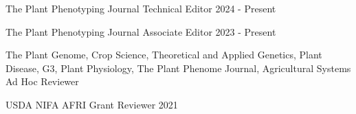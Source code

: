 
\begin{cventries}

  \cventry
    {The Plant Phenotyping Journal} %
    {Technical Editor} %
    {} %
    {2024 - Present} %
    {}

  \cventry
    {The Plant Phenotyping Journal} %
    {Associate Editor} %
    {} %
    {2023 - Present} %
    {}

  \cventry
    {The Plant Genome, Crop Science, Theoretical and Applied Genetics, Plant Disease, G3, Plant Physiology, The Plant Phenome Journal, Agricultural Systems} %
    {Ad Hoc Reviewer} %
    {} %
    {} %
    {}

  \cventry
    {USDA NIFA AFRI} %
    {Grant Reviewer} %
    {} %
    {2021} %
    {}

\end{cventries}
